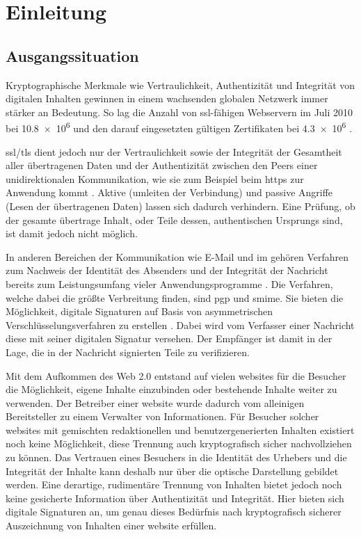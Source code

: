 
\chapter{Einleitung}
\label{chap:Einleitung}

\section{Ausgangssituation}
\label{sec:Einleitung:ausgangssituation}
Kryptographische Merkmale wie Vertraulichkeit, Authentizität und Integrität von digitalen Inhalten gewinnen in einem wachsenden globalen Netzwerk immer
stärker an Bedeutung. So lag die Anzahl von \gls{ssl}-fähigen Webservern im Juli 2010 bei \num{10.8e6} und den darauf eingesetzten gültigen Zertifikaten bei
\num{4.3e6} \cite{ssliverse:eff}.

\gls{ssl}/\gls{tls} dient jedoch nur der Vertraulichkeit sowie der Integrität der Gesamtheit aller übertragenen Daten und der Authentizität zwischen den Peers
einer unidirektionalen  Kommunikation, wie sie zum Beispiel beim \gls{https} zur Anwendung kommt \cite{kits}. Aktive (umleiten der Verbindung) und passive
Angriffe (Lesen der übertragenen Daten) lassen sich dadurch verhindern. Eine Prüfung, ob der gesamte übertrage Inhalt, oder Teile dessen, authentischen
Ursprungs sind, ist damit jedoch nicht möglich.

In anderen Bereichen der Kommunikation wie E-Mail und \gls{im} gehören Verfahren zum Nachweis der Identität des Absenders und der Integrität der Nachricht
bereits zum Leistungsumfang vieler Anwendungsprogramme \cite{Garfinkel:2003:EEC:1123196.1123244}.
Die Verfahren, welche dabei die größte Verbreitung finden, sind \gls{pgp} und \gls{smime}. Sie bieten die Möglichkeit, digitale Signaturen auf Basis von asymmetrischen
Verschlüsselungsverfahren zu erstellen \cite{kits}. Dabei wird vom Verfasser einer Nachricht diese mit seiner digitalen Signatur versehen. Der Empfänger ist damit
in der Lage, die in der Nachricht signierten Teile zu verifizieren.

Mit dem Aufkommen des Web 2.0 entstand auf vielen \glspl{website} für die Besucher die Möglichkeit, eigene Inhalte einzubinden oder bestehende Inhalte weiter zu
verwenden. Der Betreiber einer \gls{website} wurde dadurch vom alleinigen Bereitsteller zu einem Verwalter von Informationen. Für Besucher solcher
\glspl{website} mit gemischten redaktionellen und benutzergenerierten Inhalten existiert noch keine Möglichkeit, diese Trennung auch kryptografisch sicher
nachvollziehen zu können. Das Vertrauen eines Besuchers in die Identität des Urhebers und die Integrität der Inhalte kann deshalb nur über die optische
Darstellung gebildet werden. Eine derartige, rudimentäre Trennung von Inhalten bietet jedoch noch keine gesicherte Information über Authentizität und
Integrität. Hier bieten sich digitale Signaturen an, um genau dieses Bedürfnis nach kryptografisch sicherer Auszeichnung von Inhalten einer \gls{website} erfüllen.

